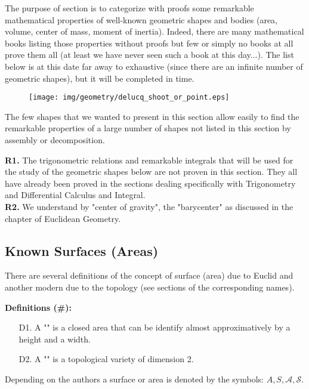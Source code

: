 {The purpose of section is to categorize with proofs some remarkable mathematical properties of well-known geometric shapes and bodies (area, volume, center of mass, moment of inertia). Indeed, there are many mathematical books listing those properties without proofs but few or simply no books at all prove them all (at least we have never seen such a book at this day...). The list below is at this date far away to exhaustive (since there are an infinite number of geometric shapes), but it will be completed in time.

\begin{figure}[H]
\centering
\texttt{[image: img/geometry/delucq\_shoot\_or\_point.eps]}
\end{figure}

The few shapes that we wanted to present in this section allow easily to find the remarkable properties of a large number of shapes not listed in this section by assembly or decomposition.

	\begin{tcolorbox}[title=Remarks,colframe=black,arc=10pt]
	\textbf{R1.} The trigonometric relations and remarkable integrals that will be used for the study of the geometric shapes below are not proven in this section. They all have already been proved in the sections dealing specifically with Trigonometry and Differential Calculus and Integral.\\
	
	\textbf{R2.} We understand by "center of gravity", the "barycenter" as discussed in the chapter of Euclidean Geometry.
	\end{tcolorbox}	
	
	\subsection{Known Surfaces (Areas)}\label{known surfaces}
	There are several definitions of the concept of surface (area) due to Euclid and another modern due to the topology (see sections of the corresponding names).

\textbf{Definitions (\#\mydef):}
	\begin{enumerate}
		\item[D1.] A "" is a closed area that can be identify almost approximatively by a height and a width.
		\item[D2.] A "" is a topological variety of dimension 2.
	\end{enumerate}
	Depending on the authors a surface or area is denoted by the symbols: $A, S, \mathcal{A}, \mathcal{S}$.

}
